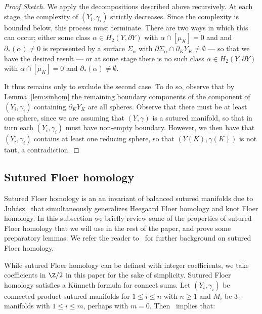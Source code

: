\documentclass{amsart}
\theoremstyle{definition}
\theoremstyle{remark}
\numberwithin{equation}{section}
\begin{document}
\begin{proof}[Proof Sketch]
We apply the decompositions described above recursively. At each stage, the complexity of $(Y_i,\gamma_i)$ strictly decreases. Since the complexity is bounded below, this process must terminate. There are two ways in which this can occur; either some class $\alpha\in H_2(Y,\partial Y)$ with $\alpha\cap[\mu_K]=0$ and and $\partial_*(\alpha)\neq 0$ is represented by a surface $\Sigma_\alpha$ with $\partial \Sigma_\alpha\cap\partial_KY_K\neq\emptyset$ --- so that we have the desired result --- or at some stage there is no such class $\alpha\in H_2(Y,\partial Y)$ with $\alpha\cap[\mu_K]=0$ and $\partial_*(\alpha)\neq \emptyset$.

It thus remains only to exclude the second case. To do so, observe that by Lemma~\ref{lem:sinhom} the remaining boundary components of the component of $(Y_i,\gamma_i)$ containing $\partial_KY_K$ are all spheres. Observe that there must be at least one sphere, since we are assuming that $(Y,\gamma)$ is a sutured manifold, so that in turn each $(Y_i,\gamma_i)$ must have non-empty boundary. However, we then have that $(Y_i,\gamma_i)$ contains at least one reducing sphere, so that $(Y(K),\gamma(K))$ is not taut, a contradiction.
\end{proof}


\subsection{Sutured Floer homology}\label{subsec:SFH} Sutured Floer homology is an an invariant of balanced sutured manifolds due to Juh\'asz~\cite{juhasz2006holomorphic} that simultaneously generalizes Heegaard Floer homology and knot Floer homology. In this subsection we briefly review some of the properties of sutured Floer homology that we will use in the rest of the paper, and prove some preparatory lemmas. We refer the reader to~\cite{juhasz2006holomorphic,juhasz2010sutured} for further background on sutured Floer homology.

 While sutured Floer homology can be defined with integer coefficients, we take coefficients in $\Z/2$ in this paper for the sake of simplicity. Sutured Floer homology satisfies a K\"unneth formula for connect sums. Let $(Y_i,\gamma_i)$ be connected product sutured manifolds for $1\leq i\leq n$ with $n\geq 1$ and $M_i$ be $3$-manifolds with $1\leq i\leq m$, perhaps with $m=0$. Then~\cite[Proposition 9.15]{juhasz2006holomorphic} implies that:
\end{document}
